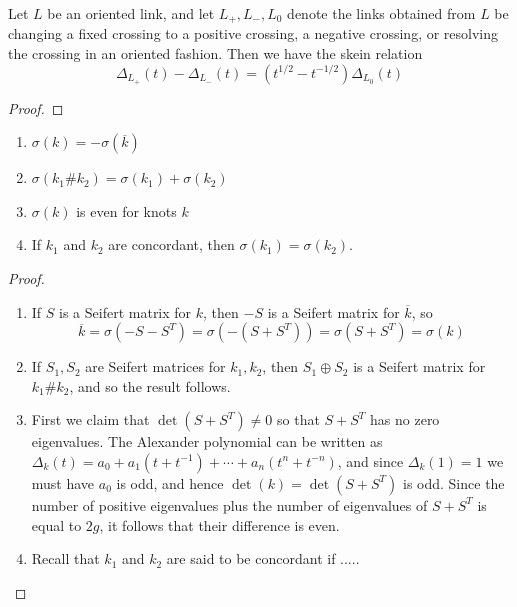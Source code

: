 \begin{exercise}
Let $L$ be an oriented link, and let $L_+,L_-,L_0$ denote the links obtained from $L$ be changing a fixed crossing to a positive crossing, a negative crossing, or resolving the crossing in an oriented fashion. Then we have the skein relation
\[ \Delta_{L_+}(t) - \Delta_{L_-}(t) = (t^{1/2}-t^{-1/2}) \Delta_{L_0}(t) \]
\end{exercise}
\begin{proof}

\end{proof}



\begin{exercise}
\sloppyspace
\begin{enumerate}
	\item $\sigma(k) = -\sigma(\overline k)$
	\item $\sigma(k_1 \# k_2) = \sigma(k_1) + \sigma(k_2)$
	\item $\sigma(k)$ is even for knots $k$
	\item If $k_1$ and $k_2$ are concordant, then $\sigma(k_1)=\sigma(k_2)$.
\end{enumerate}
\end{exercise}
\begin{proof}
\sloppyspace
\begin{enumerate}
	\item If $S$ is a Seifert matrix for $k$, then $-S$ is a Seifert matrix for $\overline k$, so
	\[ \overline k = \sigma(-S - S^T) = \sigma(-(S+S^T)) = \sigma(S+S^T) = \sigma(k) \]
	
	\item If $S_1,S_2$ are Seifert matrices for $k_1,k_2$, then $S_1 \oplus S_2$ is a Seifert matrix for $k_1 \# k_2$, and so the result follows.
	
	\item First we claim that $\det(S+S^T) \neq 0$ so that $S+S^T$ has no zero eigenvalues. The Alexander polynomial can be written as $\Delta_k(t) = a_0 + a_1(t+t^{-1}) + \cdots + a_n(t^n+t^{-n})$, and since $\Delta_k(1)=1$ we must have $a_0$ is odd, and hence $\det(k) = \det(S+S^T)$ is odd. Since the number of positive eigenvalues plus the number of eigenvalues of $S+S^T$ is equal to $2g$, it follows that their difference is even.
	
	\item Recall that $k_1$ and $k_2$ are said to be concordant if .....
\end{enumerate}
\end{proof}



